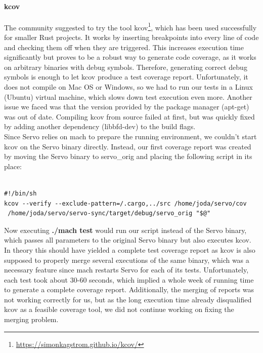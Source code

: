 \documentclass{scrartcl}
\begin{document}
\paragraph{kcov}
The community suggested to try the tool kcov\footnote{\url{https://simonkagstrom.github.io/kcov/}}, which has been used successfully for smaller Rust projects. It works by inserting breakpoints into every line of code and checking them off when they are triggered. This increases execution time significantly but proves to be a robust way to generate code coverage, as it works on arbitrary binaries with debug symbols. Therefore, generating correct debug symbols is enough to let kcov produce a test coverage report. Unfortunately, it does not compile on Mac OS or Windows, so we had to run our tests in a Linux (Ubuntu) virtual machine, which slows down test execution even more. Another issue we faced was that the version provided by the package manager (apt-get) was out of date. Compiling kcov from source failed at first, but was quickly fixed by adding another dependency (libbfd-dev) to the build flags.\\

Since Servo relies on mach to prepare the running environment, we couldn't start kcov on the Servo binary directly. Instead, our first coverage report was created by moving the Servo binary to servo\_orig and placing the following script in its place:

\begin{verbatim}

#!/bin/sh
kcov --verify --exclude-pattern=/.cargo,../src /home/joda/servo/cov 
 /home/joda/servo/servo-sync/target/debug/servo_orig "$@"

\end{verbatim}

Now executing \textbf{./mach test} would run our script instead of the Servo binary, which passes all parameters to the original Servo binary but also executes kcov. In theory this should have yielded a complete test coverage report as kcov is also supposed to properly merge several executions of the same binary, which was a necessary feature since mach restarts Servo for each of its tests. Unfortunately, each test took about 30-60 seconds, which implied a whole week of running time to generate a complete coverage report. Additionally, the merging of reports was not working correctly for us, but as the long execution time already disqualified kcov as a feasible coverage tool, we did not continue working on fixing the merging problem.\\
\end{document}
